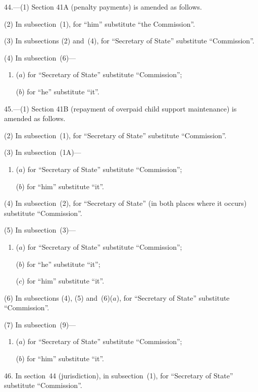 \documentclass[12pt,a4paper]{article}
\begin{document}
44.---(1) Section 41A (penalty payments) is amended as follows.

(2) In subsection~(1), for “him” substitute “the Commission”.

(3) In subsections (2) and~(4), for “Secretary of State” substitute “Commission”.

(4) In subsection~(6)—
\begin{enumerate}\item[]
($a$) for “Secretary of State” substitute “Commission”;

($b$) for “he” substitute “it”.
\end{enumerate}

\medskip

45.---(1) Section 41B (repayment of overpaid child support maintenance) is amended as follows.

(2) In subsection~(1), for “Secretary of State” substitute “Commission”.

(3) In subsection~(1A)—
\begin{enumerate}\item[]
($a$) for “Secretary of State” substitute “Commission”;

($b$) for “him” substitute “it”.
\end{enumerate}

(4) In subsection~(2), for “Secretary of State” (in both places where it occurs) substitute “Commission”.

(5) In subsection~(3)—
\begin{enumerate}\item[]
($a$) for “Secretary of State” substitute “Commission”;

($b$) for “he” substitute “it”;

($c$) for “him” substitute “it”.
\end{enumerate}

(6) In subsections (4), (5) and~(6)($a$), for “Secretary of State” substitute “Commission”.

(7) In subsection~(9)—
\begin{enumerate}\item[]
($a$) for “Secretary of State” substitute “Commission”;

($b$) for “him” substitute “it”.
\end{enumerate}

\medskip

46. In section~44 (jurisdiction), in subsection~(1), for “Secretary of State” substitute “Commission”.

\medskip
\end{document}
